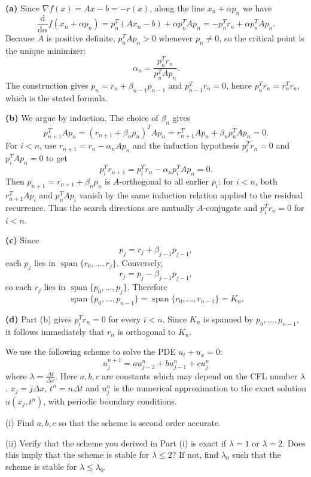 \begin{solution}
\textbf{(a)} Since $\nabla f(x)=Ax-b=-r(x)$, along the line $x_n+\alpha p_n$ we have
\[
\frac{\mathrm{d}}{\mathrm{d}\alpha}f(x_n+\alpha p_n)
=p_n^T(Ax_n-b)+\alpha p_n^TAp_n
=-p_n^Tr_n+\alpha p_n^TAp_n.
\]
Because $A$ is positive definite, $p_n^TAp_n>0$ whenever $p_n\neq0$, so the critical point is the unique minimizer:
\[
\alpha_n=\frac{p_n^Tr_n}{p_n^TAp_n}.
\]
The construction gives $p_n=r_n+\beta_{n-1}p_{n-1}$ and $p_{n-1}^Tr_n=0$, hence $p_n^Tr_n=r_n^Tr_n$, which is the stated formula.

\textbf{(b)} We argue by induction.  The choice of $\beta_n$ gives
\[
p_{n+1}^TAp_n=(r_{n+1}+\beta_np_n)^TAp_n
=r_{n+1}^TAp_n+\beta_np_n^TAp_n=0.
\]
For $i<n$, use $r_{n+1}=r_n-\alpha_nAp_n$ and the induction hypothesis $p_i^Tr_n=0$ and $p_i^TAp_n=0$ to get
\[
p_i^Tr_{n+1}=p_i^Tr_n-\alpha_np_i^TAp_n=0.
\]
Then $p_{n+1}=r_{n+1}+\beta_np_n$ is $A$-orthogonal to all earlier $p_i$: for $i<n$, both $r_{n+1}^TAp_i$ and $p_n^TAp_i$ vanish by the same induction relation applied to the residual recurrence.  Thus the search directions are mutually $A$-conjugate and $p_i^Tr_n=0$ for $i<n$.

\textbf{(c)} Since
\[
p_{j}=r_j+\beta_{j-1}p_{j-1},
\]
each $p_j$ lies in $\operatorname{span}\{r_0,\dots,r_j\}$.  Conversely,
\[
r_j=p_j-\beta_{j-1}p_{j-1},
\]
so each $r_j$ lies in $\operatorname{span}\{p_0,\dots,p_j\}$.  Therefore
\[
\operatorname{span}\{p_0,\dots,p_{n-1}\}
=\operatorname{span}\{r_0,\dots,r_{n-1}\}
=K_n.
\]

\textbf{(d)} Part (b) gives $p_i^Tr_n=0$ for every $i<n$.  Since $K_n$ is spanned by $p_0,\dots,p_{n-1}$, it follows immediately that $r_n$ is orthogonal to $K_n$.
\end{solution}

\begin{exercise}
\label{applied:2011:8}
We use the following scheme to solve the PDE $u _ { t } + u _ { x } = 0$:
\[
u _ {j} ^ {n + 1} = a u _ {j - 2} ^ {n} + b u _ {j - 1} ^ {n} + c u _ {j} ^ {n}
\]
where $\lambda = \frac { \Delta t } { \Delta x }$. Here $a, b, c$ are constants which may depend on the CFL number $\lambda$. $x_j = j \Delta x$, $t^n = n \Delta t$ and $u_j^n$ is the numerical approximation to the exact solution $u(x_j, t^n)$, with periodic boundary conditions.

(i) Find $a, b, c$ so that the scheme is second order accurate.

(ii) Verify that the scheme you derived in Part (i) is exact if $\lambda = 1$ or $\lambda = 2$. Does this imply that the scheme is stable for $\lambda \le 2$? If not, find $\lambda _ { 0 }$ such that the scheme is stable for $\lambda \le \lambda _ { 0 }$.
\end{exercise}

